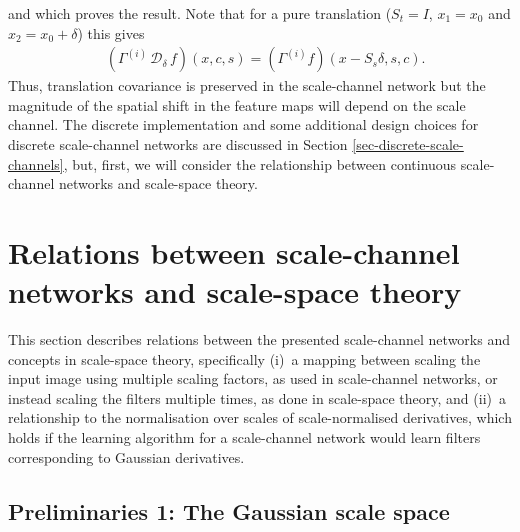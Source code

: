 \documentclass[twocolumn,runningheads]{svjour3}
\def\calD{\mathcal{D}}
\begin{document}
and which proves the result. Note that for a pure translation ($S_t = I$,  $x_1 = x_0 $  and $x_2 = x_0 + \delta$) this gives
\begin{align}
&(\Gamma^{(i)}\, \calD_\delta\, f)(x,c,s) = (\Gamma^{(i)} f)(x - S_s \delta, s, c).
\label{eq-translation-covariance-scale}
\end{align}
Thus, translation covariance is preserved in the scale-channel network
but the magnitude of the spatial shift in the feature maps will depend
on the scale channel. The discrete implementation and some additional design choices for discrete scale-channel networks are discussed in Section \ref{sec-discrete-scale-channels}, but, first, we will consider the relationship between continuous scale-channel networks and scale-space theory. 

\section{Relations between scale-channel networks and scale-space theory}
\label{sec-relations-scsp-theory}

This section describes relations between the presented scale-channel networks and concepts in scale-space theory, specifically (i)~a mapping between scaling the input image using multiple scaling factors, as used in scale-channel networks, or instead scaling the filters multiple times, as done in scale-space theory, and (ii)~a relationship to the normalisation over scales of scale-normalised derivatives, which holds if the learning algorithm for a scale-channel network would learn filters corresponding to Gaussian derivatives.

\subsection{Preliminaries 1: The Gaussian scale space}
\label{sec:gauss-prel}
\end{document}
